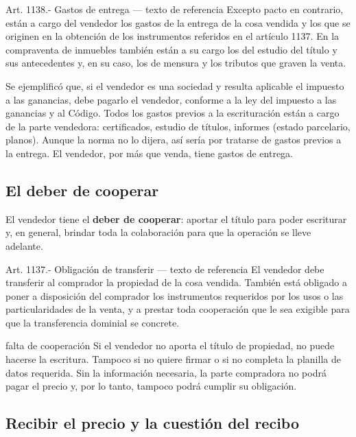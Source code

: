 \documentclass[12pt,oneside]{book}
\begin{document}
\begin{norma}{Art. 1138.- Gastos de entrega --- texto de referencia}
Excepto pacto en contrario, están a cargo del vendedor los gastos de la entrega de la cosa vendida y los que se originen en la obtención de los instrumentos referidos en el artículo 1137. En la compraventa de inmuebles también están a su cargo los del estudio del título y sus antecedentes y, en su caso, los de mensura y los tributos que graven la venta.
\end{norma}

Se ejemplificó que, si el vendedor es una sociedad y resulta aplicable el impuesto a las ganancias, debe pagarlo el vendedor, conforme a la ley del impuesto a las ganancias y al Código. Todos los gastos previos a la escrituración están a cargo de la parte vendedora: certificados, estudio de títulos, informes (estado parcelario, planos). Aunque la norma no lo dijera, así sería por tratarse de gastos previos a la entrega. El vendedor, por más que venda, tiene gastos de entrega.

\subsection{El deber de cooperar}

El vendedor tiene el \textbf{deber de cooperar}: aportar el título para poder escriturar y, en general, brindar toda la colaboración para que la operación se lleve adelante.

\begin{norma}{Art. 1137.- Obligación de transferir --- texto de referencia}
El vendedor debe transferir al comprador la propiedad de la cosa vendida. También está obligado a poner a disposición del comprador los instrumentos requeridos por los usos o las particularidades de la venta, y a prestar toda cooperación que le sea exigible para que la transferencia dominial se concrete.
\end{norma}

\begin{example}{falta de cooperación}
Si el vendedor no aporta el título de propiedad, no puede hacerse la escritura. Tampoco si no quiere firmar o si no completa la planilla de datos requerida. Sin la información necesaria, la parte compradora no podrá pagar el precio y, por lo tanto, tampoco podrá cumplir su obligación.
\end{example}

\subsection{Recibir el precio y la cuestión del recibo}
\end{document}
